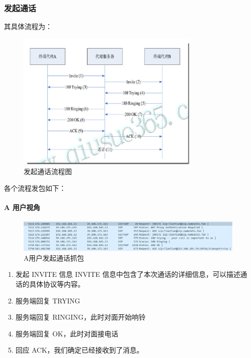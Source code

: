 \documentclass[lang=cn]{elegantpaper}
\begin{document}
\subsubsection{发起通话}
其具体流程为：
\begin{figure}[H]
    \centering
    \includegraphics[width=0.8\textwidth]{12}
    \caption{发起通话流程图}
    \label{fig:new}
\end{figure}
各个流程发包如下：

\paragraph{A 用户视角}
\begin{figure}[H]
    \centering
    \includegraphics[width=\textwidth]{13}
    \caption{A用户发起通话抓包}
    \label{fig:new}
\end{figure}
\begin{enumerate}
    \item 发起 INVITE 信息
          INVITE 信息中包含了本次通话的详细信息，可以描述通话的具体协议等内容。
    \item 服务端回复 TRYING
    \item 服务端回复 RINGING，此时对面开始响铃
    \item 服务端回复 OK，此时对面接电话
    \item 回应 ACK，我们确定已经接收到了消息。
\end{enumerate}
\end{document}
